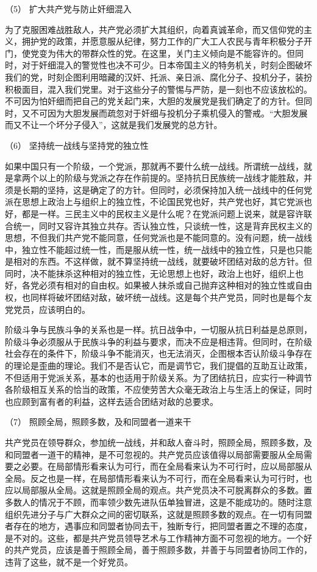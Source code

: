 \documentclass[UTF8, 12pt, a4paper]{ctexrep}
\begin{document}
（5） 扩大共产党与防止奸细混入

为了克服困难战胜敌人，共产党必须扩大其组织，向着真诚革命，而又信仰党的主义，拥护党的政策，并愿意服从纪律，努力工作的广大工人农民与青年积极分子开门，使党变为伟大的带群众性的党。在这里，关门主义倾向是不能容许的。但同时，对于奸细混入的警觉性也决不可少。日本帝国主义的特务机关，时刻企图破坏我们的党，时刻企图利用暗藏的汉奸、托派、亲日派、腐化分子、投机分子，装扮积极面目，混入我们党里。对于这些分子的警惕与严防，是一刻也不应该放松的。不可因为怕奸细而把自己的党关起门来，大胆的发展党是我们确定了的方针。但同时，又不可因为大胆发展而疏忽对于奸细与投机分子乘机侵入的警戒。“大胆发展而又不让一个坏分子侵入”，这就是我们发展党的总方针。

（6） 坚持统一战线与坚持党的独立性

如果中国只有一个阶级，一个党派，那就再不要什么统一战线。所谓统一战线，就是拿两个以上的阶级与党派之存在作前提的。坚持抗日民族统一战线才能胜敌，并须是长期的坚持，这是确定了的方针。但同时，必须保持加入统一战线中的任何党派在思想上政治上与组织上的独立性，不论国民党也好，共产党也好，其它党派也好，都是一样。三民主义中的民权主义是什么呢？在党派问题上说来，就是容许联合统一，同时又容许其独立共存。否认独立性，只谈统一性，这是背弃民权主义的思想，不但我们共产党不能同意，任何党派也是不能同意的。没有问题，统一战线中，独立性不能超过统一性，而是服从统一性，统一战线中的独立性，只是也只能是相对的东西。不这样做，就不算坚持统一战线，就要破坏团结对敌的总方针。但同时，决不能抹杀这种相对的独立性，无论思想上也好，政治上也好，组织上也好，各党必须有相对的自由权。如果被人抹杀或自己抛弃这种相对的独立性或自由权，也同样将破坏团结对敌，破坏统一战线。这是每个共产党员，同时也是每个友党党员，应该明白的。

阶级斗争与民族斗争的关系也是一样。抗日战争中，一切服从抗日利益是总原则，阶级斗争必须服从于民族斗争的利益与要求，而决不应是相违背。但同时，在阶级社会存在的条件下，阶级斗争不能消灭，也无法消灭，企图根本否认阶级斗争存在的理论是歪曲的理论。我们不是否认它，而是调节它，我们提倡的互助互让政策，不但适用于党派关系，基本的也适用于阶级关系。为了团结抗日，应实行一种调节各阶级相互关系的恰当的政策，不应使劳苦大众毫无政治上与生活上的保证，同时也应顾到富有者的利益，这样去适合团结对敌的总要求。

（7） 照顾全局，照顾多数，及和同盟者一道来干

共产党员在领导群众，参加统一战线，并和敌人奋斗时，照顾全局，照顾多数，及和同盟者一道干的精神，是不可忽视的。共产党员应该值得以局部需要服从全局需要之必要。在局部情形看来认为可行，而在全局看来认为不可行时，应以局部服从全局。反之也是一样，在局部情形看来认为不可行，而在全局看来认为可行时，也应以局部服从全局。这就是照顾全局的观点。共产党员决不可脱离群众的多数。置多数人的情况于不顾，而率领少数先进队伍单独冒进，这是不能成功的。随时注意组织先进分子与广大群众之间的密切联系，这就是照顾多数的观点。在一切有同盟者存在的地方，遇事应和同盟者协同去干，独断专行，把同盟者置之不理的态度，是不对的。这些，都是共产党员领导艺术与工作精神方面不可忽视的地方。一个好的共产党员，应该是善于照顾全局，善于照顾多数，并善于与同盟者协同工作的，违背了这些，就不是一个好党员。
\end{document}
